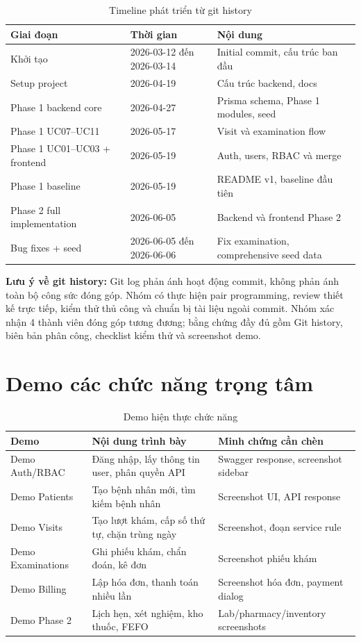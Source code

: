 \begin{longtable}{|p{3.2cm}|p{3cm}|p{7.5cm}|}
\caption{Timeline phát triển từ git history}\\
\hline
\textbf{Giai đoạn} & \textbf{Thời gian} & \textbf{Nội dung} \\
\hline
Khởi tạo & 2026-03-12 đến 2026-03-14 & Initial commit, cấu trúc ban đầu \\
\hline
Setup project & 2026-04-19 & Cấu trúc backend, docs \\
\hline
Phase 1 backend core & 2026-04-27 & Prisma schema, Phase 1 modules, seed \\
\hline
Phase 1 UC07--UC11 & 2026-05-17 & Visit và examination flow \\
\hline
Phase 1 UC01--UC03 + frontend & 2026-05-19 & Auth, users, RBAC và merge \\
\hline
Phase 1 baseline & 2026-05-19 & README v1, baseline đầu tiên \\
\hline
Phase 2 full implementation & 2026-06-05 & Backend và frontend Phase 2 \\
\hline
Bug fixes + seed & 2026-06-05 đến 2026-06-06 & Fix examination, comprehensive seed data \\
\hline
\end{longtable}

\textbf{Lưu ý về git history:} Git log phản ánh hoạt động commit, không phản ánh toàn bộ công sức đóng góp. Nhóm có thực hiện pair programming, review thiết kế trực tiếp, kiểm thử thủ công và chuẩn bị tài liệu ngoài commit. Nhóm xác nhận 4 thành viên đóng góp tương đương; bằng chứng đầy đủ gồm Git history, biên bản phân công, checklist kiểm thử và screenshot demo.

\section{Demo các chức năng trọng tâm}

\begin{longtable}{|p{3.2cm}|p{5.5cm}|p{5.5cm}|}
\caption{Demo hiện thực chức năng}\\
\hline
\textbf{Demo} & \textbf{Nội dung trình bày} & \textbf{Minh chứng cần chèn} \\
\hline
Demo Auth/RBAC & Đăng nhập, lấy thông tin user, phân quyền API & Swagger response, screenshot sidebar \\
\hline
Demo Patients & Tạo bệnh nhân mới, tìm kiếm bệnh nhân & Screenshot UI, API response \\
\hline
Demo Visits & Tạo lượt khám, cấp số thứ tự, chặn trùng ngày & Screenshot, đoạn service rule \\
\hline
Demo Examinations & Ghi phiếu khám, chẩn đoán, kê đơn & Screenshot phiếu khám \\
\hline
Demo Billing & Lập hóa đơn, thanh toán nhiều lần & Screenshot hóa đơn, payment dialog \\
\hline
Demo Phase 2 & Lịch hẹn, xét nghiệm, kho thuốc, FEFO & Lab/pharmacy/inventory screenshots \\
\hline
\end{longtable}

